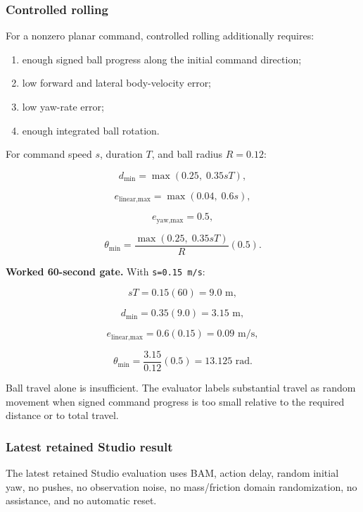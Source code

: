 \documentclass[
  american,
  11pt,
  letterpaper,
]{article}
\providecommand{\tightlist}{%
  \setlength{\itemsep}{0pt}\setlength{\parskip}{0pt}}
\begin{document}
\subsubsection{Controlled rolling}\label{controlled-rolling}

For a nonzero planar command, controlled rolling additionally requires:

\begin{enumerate}
\def\labelenumi{\arabic{enumi}.}
\tightlist
\item
  enough signed ball progress along the initial command direction;
\item
  low forward and lateral body-velocity error;
\item
  low yaw-rate error;
\item
  enough integrated ball rotation.
\end{enumerate}

For command speed \(s\), duration \(T\), and ball radius \(R=0.12\):

\[
d_{\min}=\max(0.25,\;0.35sT),
\]

\[
e_{\text{linear,max}}=\max(0.04,\;0.6s),
\]

\[
e_{\text{yaw,max}}=0.5,
\]

\[
\theta_{\min}
=\frac{\max(0.25,\;0.35sT)}{R}(0.5).
\]

\textbf{Worked 60-second gate.} With \texttt{s=0.15\ m/s}:

\[
sT=0.15(60)=9.0\text{ m},
\]

\[
d_{\min}=0.35(9.0)=3.15\text{ m},
\]

\[
e_{\text{linear,max}}=0.6(0.15)=0.09\text{ m/s},
\]

\[
\theta_{\min}=\frac{3.15}{0.12}(0.5)=13.125\text{ rad}.
\]

Ball travel alone is insufficient. The evaluator labels substantial
travel as random movement when signed command progress is too small
relative to the required distance or to total travel.

\subsubsection{Latest retained Studio
result}\label{latest-retained-studio-result}

The latest retained Studio evaluation uses BAM, action delay, random
initial yaw, no pushes, no observation noise, no mass/friction domain
randomization, no assistance, and no automatic reset.
\end{document}
